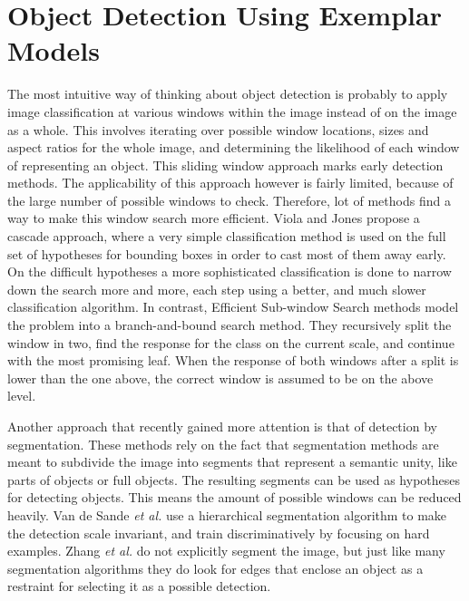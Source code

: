\chapter{Object Detection Using Exemplar Models} %
\label{sec:object_detection}

\begin{figure}[hbt]
    \centering
\end{figure}

The most intuitive way of thinking about object detection is probably to apply image classification at various windows within the image instead of on the image as a whole. This involves iterating over possible window locations, sizes and aspect ratios for the whole image, and determining the likelihood of each window of representing an object. This sliding window approach marks early detection methods.\cite{viola2004robust} The applicability of this approach however is fairly limited, because of the large number of possible windows to check. Therefore, lot of methods find a way to make this window search more efficient. Viola and Jones\cite{viola2004robust} propose a cascade approach, where a very simple classification method is used on the full set of hypotheses for bounding boxes in order to cast most of them away early. On the difficult hypotheses a more sophisticated classification is done to narrow down the search more and more, each step using a better, and much slower classification algorithm. In contrast, Efficient Sub-window Search methods\cite{ lampert2008beyond, yeh2009fast, pedersoli2011coarse, behmo2010towards} model the problem into a branch-and-bound search method. They recursively split the window in two, find the response for the class on the current scale, and continue with the most promising leaf. When the response of both windows after a split is lower than the one above, the correct window is assumed to be on the above level.

Another approach that recently gained more attention is that of detection by segmentation.\cite{van2011segmentation,zhang2010free} These methods rely on the fact that segmentation methods are meant to subdivide the image into segments that represent a semantic unity, like parts of objects or full objects. The resulting segments can be used as hypotheses for detecting objects. This means the amount of possible windows can be reduced heavily. Van de Sande \emph{et al.}\cite{van2011segmentation} use a hierarchical segmentation algorithm to make the detection scale invariant, and train discriminatively by focusing on hard examples. Zhang \emph{et al.}\cite{zhang2010free} do not explicitly segment the image, but just like many segmentation algorithms they do look for edges that enclose an object as a restraint for selecting it as a possible detection.

